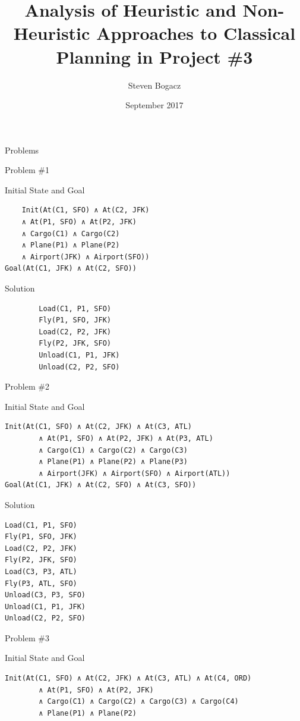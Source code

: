 \documentclass{article}
\title{Analysis of Heuristic and Non-Heuristic Approaches to Classical Planning in Project \#3}
\author{Steven Bogacz}
\date{September 2017}
\begin{document}
\maketitle
\begin{section}{Problems}
\begin{subsection}{Problem \#1}
	\begin{subsubsection}{Initial State and Goal}
	\begin{verbatim}
	Init(At(C1, SFO) ∧ At(C2, JFK) 
	∧ At(P1, SFO) ∧ At(P2, JFK) 
	∧ Cargo(C1) ∧ Cargo(C2) 
	∧ Plane(P1) ∧ Plane(P2)
	∧ Airport(JFK) ∧ Airport(SFO))
Goal(At(C1, JFK) ∧ At(C2, SFO))\end{verbatim}
\end{subsubsection}
\begin{subsubsection}{Solution}
	\begin{verbatim}
		Load(C1, P1, SFO)
		Fly(P1, SFO, JFK)
		Load(C2, P2, JFK)
		Fly(P2, JFK, SFO)
		Unload(C1, P1, JFK)
		Unload(C2, P2, SFO)
	\end{verbatim}
\end{subsubsection}
\end{subsection}
\begin{subsection}{Problem \#2}
	\begin{subsubsection}{Initial State and Goal}
	\begin{verbatim}
Init(At(C1, SFO) ∧ At(C2, JFK) ∧ At(C3, ATL) 
		∧ At(P1, SFO) ∧ At(P2, JFK) ∧ At(P3, ATL) 
		∧ Cargo(C1) ∧ Cargo(C2) ∧ Cargo(C3)
		∧ Plane(P1) ∧ Plane(P2) ∧ Plane(P3)
		∧ Airport(JFK) ∧ Airport(SFO) ∧ Airport(ATL))
Goal(At(C1, JFK) ∧ At(C2, SFO) ∧ At(C3, SFO))\end{verbatim}
\end{subsubsection}
\begin{subsubsection}{Solution}
	\begin{verbatim}
Load(C1, P1, SFO)
Fly(P1, SFO, JFK)
Load(C2, P2, JFK)
Fly(P2, JFK, SFO)
Load(C3, P3, ATL)
Fly(P3, ATL, SFO)
Unload(C3, P3, SFO)
Unload(C1, P1, JFK)
Unload(C2, P2, SFO)
	\end{verbatim}
\end{subsubsection}
\end{subsection}
\begin{subsection}{Problem \#3}
	\begin{subsubsection}{Initial State and Goal}
	\begin{verbatim}
Init(At(C1, SFO) ∧ At(C2, JFK) ∧ At(C3, ATL) ∧ At(C4, ORD) 
		∧ At(P1, SFO) ∧ At(P2, JFK) 
		∧ Cargo(C1) ∧ Cargo(C2) ∧ Cargo(C3) ∧ Cargo(C4)
		∧ Plane(P1) ∧ Plane(P2)

\end{verbatim}
\end{subsubsection}
\end{subsection}
\end{section}
\end{document}
